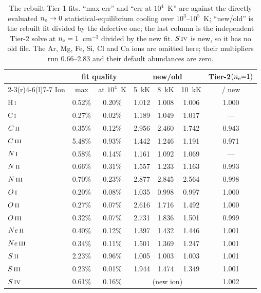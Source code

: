 \documentclass[english,a4paper]{my_memo}
\newcommand{\HI}{H\,\textsc{i}}
\newcommand{\OI}{O\,\textsc{i}}
\newcommand{\OII}{O\,\textsc{ii}}
\newcommand{\OIII}{O\,\textsc{iii}}
\newcommand{\NI}{N\,\textsc{i}}
\newcommand{\NII}{N\,\textsc{ii}}
\newcommand{\NIII}{N\,\textsc{iii}}
\newcommand{\CII}{C\,\textsc{ii}}
\newcommand{\CIII}{C\,\textsc{iii}}
\newcommand{\SII}{S\,\textsc{ii}}
\newcommand{\SIII}{S\,\textsc{iii}}
\newcommand{\SIV}{S\,\textsc{iv}}
\newcommand{\NeII}{Ne\,\textsc{ii}}
\newcommand{\NeIII}{Ne\,\textsc{iii}}
\newcommand{\nel}{n_{\rm e}}
\begin{document}
\begin{table}[htbp]
\centering
\caption{The rebuilt Tier-1 fits.  ``max err'' and ``err at $10^4$~K'' are
against the directly evaluated $\nel\to0$ statistical-equilibrium cooling over
$10^3$--$10^5$~K; ``new/old'' is the rebuilt fit divided by the defective one;
the last column is the independent Tier-2 solve at $\nel = 1$~cm$^{-3}$ divided
by the new fit.  $\SIV{}$ is new, so it has no old file.  The Ar, Mg, Fe, Si,
Cl and Ca ions are omitted here; their multipliers run 0.66--2.83 and their
default abundances are zero.}
\label{tab:newfits}
\begin{tabular}{lcc@{\hspace{2em}}ccc@{\hspace{2em}}c}
\toprule
 & \multicolumn{2}{c}{fit quality} & \multicolumn{3}{c}{new/old} & Tier-2$(\nel{=}1)$ \\
\cmidrule(r){2-3}\cmidrule(r){4-6}\cmidrule(l){7-7}
Ion & max & at $10^4$~K & 5~kK & 8~kK & 10~kK & / new \\
\midrule
\HI{}      & 0.52\% & 0.20\% & 1.012 & 1.008 & 1.006 & 1.000 \\
C\,\textsc{i}   & 0.27\% & 0.02\% & 1.189 & 1.049 & 1.017 & --- \\
$\CII{}$   & 0.35\% & 0.12\% & 2.956 & 2.460 & 1.742 & 0.943 \\
$\CIII{}$  & 5.48\% & 0.93\% & 1.442 & 1.246 & 1.191 & 0.971 \\
$\NI{}$    & 0.58\% & 0.14\% & 1.161 & 1.092 & 1.069 & --- \\
$\NII{}$   & 0.66\% & 0.31\% & 1.557 & 1.233 & 1.163 & 0.993 \\
$\NIII{}$  & 0.70\% & 0.23\% & 2.877 & 2.845 & 2.564 & 0.998 \\
$\OI{}$    & 0.20\% & 0.08\% & 1.035 & 0.998 & 0.997 & 1.000 \\
$\OII{}$   & 0.27\% & 0.07\% & 2.616 & 1.716 & 1.492 & 1.000 \\
$\OIII{}$  & 0.32\% & 0.07\% & 2.731 & 1.836 & 1.501 & 0.999 \\
$\NeII{}$  & 0.40\% & 0.12\% & 1.397 & 1.432 & 1.446 & 1.001 \\
$\NeIII{}$ & 0.34\% & 0.11\% & 1.501 & 1.369 & 1.247 & 1.001 \\
$\SII{}$   & 2.23\% & 0.96\% & 1.005 & 1.003 & 1.003 & 1.001 \\
$\SIII{}$  & 0.23\% & 0.01\% & 1.944 & 1.474 & 1.349 & 1.001 \\
$\SIV{}$   & 0.61\% & 0.16\% & \multicolumn{3}{c}{(new ion)}   & 1.002 \\
\bottomrule
\end{tabular}
\end{table}
\end{document}
